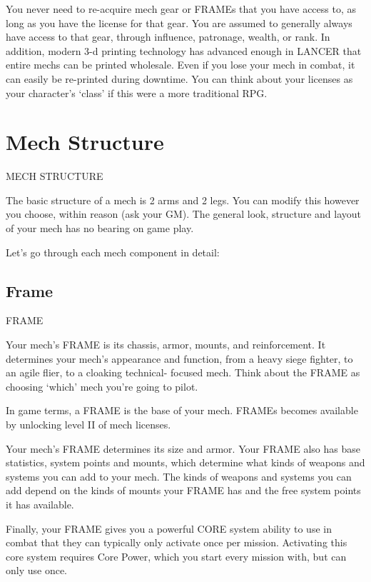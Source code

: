 You never need to re-acquire mech gear or FRAMEs that you have access to, as long as you  
have the license for that gear. You are assumed to generally always have access to that gear,  
through influence, patronage, wealth, or rank. In addition, modern 3-d printing technology has  
advanced enough in LANCER that entire mechs can be printed wholesale. Even if you lose your  
mech in combat, it can easily be re-printed during downtime. You can think about your licenses  
as your character’s ‘class’ if this were a more traditional RPG.
 
\section{Mech Structure}
                                        MECH STRUCTURE  

                                                                                                             


The basic structure of a mech is 2 arms and 2 legs. You can modify this however you choose,  
within reason (ask your GM). The general look, structure and layout of your mech has no  
bearing on game play.
 

Let’s go through each mech component in detail:
 
\subsection{Frame}
                                                 FRAME  

Your mech’s FRAME is its chassis, armor, mounts, and reinforcement. It determines your mech’s  
appearance and function, from a heavy siege fighter, to an agile flier, to a cloaking technical- 
focused mech. Think about the FRAME as choosing ‘which’ mech you’re going to pilot.
 

In game terms, a FRAME is the base of your mech. FRAMEs becomes available by unlocking  
level II of mech licenses. 
 

Your mech’s FRAME determines its size and armor. Your FRAME also has base statistics,  
system points and mounts, which determine what kinds of weapons and systems you can add  
to your mech. The kinds of weapons and systems you can add depend on the kinds of mounts  
your FRAME has and the free system points it has available.
 

Finally, your FRAME gives you a powerful CORE system ability to use in combat that they can  
typically only activate once per mission. Activating this core system requires Core Power, which  
you start every mission with, but can only use once.

